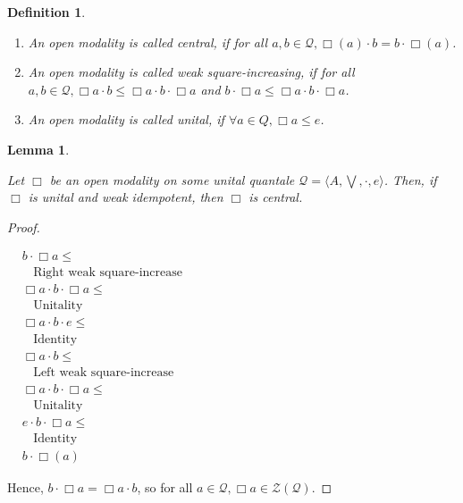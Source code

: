 \documentclass[a4paper]{article}
\theoremstyle{defin}
\newtheorem{defin}{Definition}
\theoremstyle{theorem}
\theoremstyle{prop}
\theoremstyle{lemma}
\newtheorem{lemma}{Lemma}
\theoremstyle{ex}
\theoremstyle{col}
\begin{document}
\begin{defin}
$ $
\begin{enumerate}
  \item An open modality is called central, if for all
  $a, b \in \mathcal{Q}, \Box(a) \cdot b = b \cdot \Box(a)$.

  \item An open modality is called weak square-increasing,
  if for all $a, b \in \mathcal{Q}, \Box a \cdot b \leq \Box a \cdot b \cdot \Box a$ and
  $b \cdot \Box a \leq \Box a \cdot b \cdot \Box a$.

  \item An open modality is called unital, if $\forall a \in Q, \Box a \leq e$.
\end{enumerate}
\end{defin}

\begin{lemma}
$ $

  Let $\Box$ be an open modality on some unital quantale $\mathcal{Q} = \langle A, \bigvee, \cdot, e \rangle$.
  Then, if $\Box$ is unital and weak idempotent, then $\Box$ is central.
\end{lemma}

\begin{proof}
$ $

  $\begin{array}{lll}
  & b \cdot \Box a \leq & \\
  & \:\:\:\: \text{Right weak square-increase}& \\
  &\Box a \cdot b \cdot \Box a \leq & \\
  & \:\:\:\: \text{Unitality}& \\
  & \Box a \cdot b \cdot e \leq & \\
  & \:\:\:\: \text{Identity}& \\
  &\Box a \cdot b \leq & \\
  & \:\:\:\: \text{Left weak square-increase}& \\
  &\Box a \cdot b \cdot \Box a \leq & \\
  & \:\:\:\: \text{Unitality}& \\
  &e \cdot b \cdot \Box a \leq & \\
  & \:\:\:\: \text{Identity}& \\
  &b \cdot \Box(a)&
  \end{array}$

Hence, $b \cdot \Box a = \Box a \cdot b$, so for all $a \in \mathcal Q, \Box a \in \mathcal{Z}(\mathcal{Q})$.

\end{proof}
\end{document}
